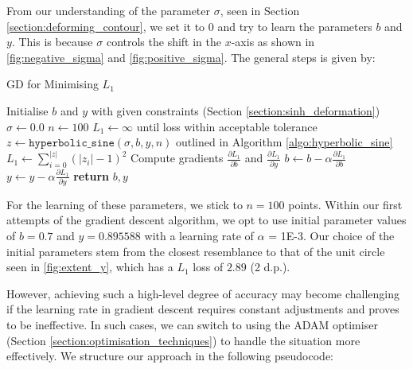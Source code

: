 \documentclass[a4paper]{report}
\begin{document}
From our understanding of the parameter $\sigma$, seen in Section \ref{section:deforming_contour}, we set it to 0 and try to learn the parameters $b$ and $y$. This is because $\sigma$ controls the shift in the $x$-axis as shown in \autoref{fig:negative_sigma} and \autoref{fig:positive_sigma}. The general steps is given by:

\begin{algorithm}[H]
\caption{GD for Minimising \( L_1 \)}
\label{algo:gd_l1}
\begin{algorithmic}[1]
    \State Initialise $b$ and $y$ \Comment with given constraints (Section \ref{section:sinh_deformation})
    \State $\sigma \gets 0.0$
    \State $n \gets 100$
    \State $L_1 \gets \infty$
     \Comment until loss within acceptable tolerance 
        \State $z \gets \texttt{hyperbolic\_sine}(\sigma, b, y, n)$ \Comment outlined in Algorithm \ref{algo:hyperbolic_sine}
        \State $L_1 \gets \sum_{i=0}^{|z|} (|z_i| - 1)^2$
        \State Compute gradients $\frac{\partial L_1}{\partial b}$ and $\frac{\partial L_1}{\partial y}$
        \State $b \gets b - \alpha \frac{\partial L_1}{\partial b}$
        \State $y \gets y - \alpha \frac{\partial L_1}{\partial y}$
    \EndWhile
    \State \textbf{return} $b, y$
\EndProcedure
\end{algorithmic}
\end{algorithm}

For the learning of these parameters, we stick to $n = 100$ points. Within our first attempts of the gradient descent algorithm, we opt to use initial parameter values of $b = 0.7$ and $y = 0.895588$ with a learning rate of $\alpha$ = 1E-3. Our choice of the initial parameters stem from the closest resemblance to that of the unit circle seen in \autoref{fig:extent_y}, which has a $L_1$ loss of $2.89$ (2 d.p.).
 
 However, achieving such a high-level degree of accuracy may become challenging if the learning rate in gradient descent requires constant adjustments and proves to be ineffective. In such cases, we can switch to using the ADAM optimiser (Section \ref{section:optimisation_techniques}) to handle the situation more effectively. We structure our approach in the following pseudocode:
 
\end{document}
